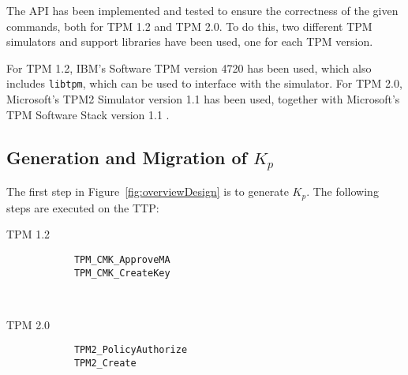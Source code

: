 {The API has been implemented and tested to ensure the correctness of the given commands, both for TPM 1.2 and TPM 2.0.
To do this, two different TPM simulators and support libraries have been used, one for each TPM version.

For TPM 1.2, IBM's Software TPM version 4720 \cite{ibmswtpm} has been used, which also includes \texttt{libtpm}, which can be used to interface with the simulator.
For TPM 2.0, Microsoft's TPM2 Simulator version 1.1 \cite{mstpm2sim} has been used, together with Microsoft's TPM Software Stack version 1.1 \cite{mstssmsr11}.

\subsection{Generation and Migration of $K_p$} \label{sec:unifiedapikp}

The first step in Figure~\ref{fig:overviewDesign} is to generate $K_p$. The following steps are executed on the TTP:
\begin{center}
	\begin{minipage}{0.4\linewidth}
		\begin{center}
			TPM 1.2
		\end{center}
		\begin{tpmcommands}
			\begin{verbatim}
			TPM_CMK_ApproveMA
			TPM_CMK_CreateKey
			\end{verbatim}
		\end{tpmcommands}
	\end{minipage}
	~~~~~~~~
	\begin{minipage}{0.4\linewidth}
		\begin{center}
			TPM 2.0
		\end{center}
		\begin{tpmcommands}
			\begin{verbatim}
			TPM2_PolicyAuthorize
			TPM2_Create
			\end{verbatim}
		\end{tpmcommands}
	\end{minipage}
\end{center}

}

